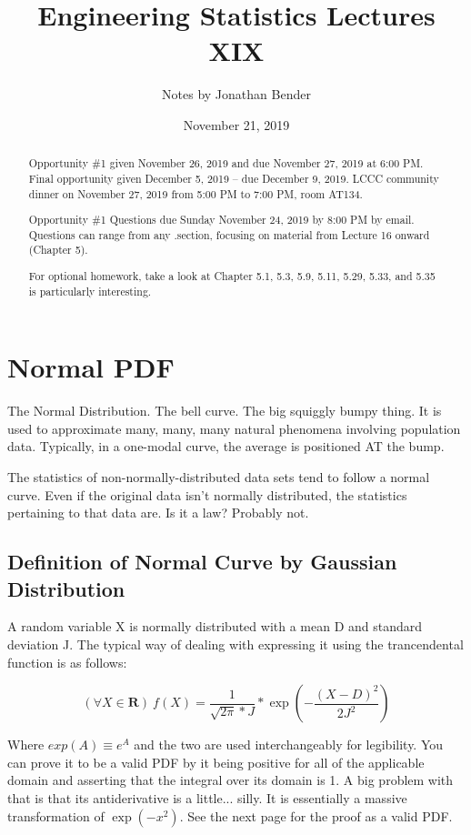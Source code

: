 \documentclass[]{article}
\title{Engineering Statistics Lectures XIX}
\author{Notes by Jonathan Bender}
\date{November 21, 2019}
\begin{document}
	
	\maketitle
	
	\begin{abstract}
		Opportunity \#1 given November 26, 2019 and due November 27, 2019 at 6:00 PM.
		Final opportunity given December 5, 2019 -- due December 9, 2019.
		LCCC community dinner on November 27, 2019 from 5:00 PM to 7:00 PM, room AT134.
		
		Opportunity \#1 Questions due Sunday November 24, 2019 by 8:00 PM by email. Questions can range from any .section, focusing on material from Lecture 16 onward (Chapter 5).
		
		For optional homework, take a look at Chapter 5.1, 5.3, 5.9, 5.11, 5.29, 5.33, and 5.35 is particularly interesting.
	\end{abstract}

	\section{Normal PDF}
		The Normal Distribution. The bell curve. The big squiggly bumpy thing. It is used to approximate many, many, many natural phenomena involving population data. Typically, in a one-modal curve, the average is positioned AT the bump.
		
		The statistics of non-normally-distributed data sets tend to follow a normal curve. Even if the original data isn't normally distributed, the statistics pertaining to that data are. Is it a law? Probably not. 
		
		\subsection{Definition of Normal Curve by Gaussian Distribution}
			A random variable X is normally distributed with a mean D and standard deviation J.
			The typical way of dealing with expressing it using the trancendental function is as follows:
			
			$$(\forall X\in \mathbf{R})\ f(X) = \dfrac{1}{\sqrt{2\pi}*J} * \exp{(-\dfrac{(X-D)^2}{2J^2})}$$
			
			Where $exp(A) \equiv e^A$ and the two are used interchangeably for legibility. You can prove it to be a valid PDF by it being positive for all of the applicable domain and asserting that the integral over its domain is 1. A big problem with that is that its antiderivative is a little... silly. It is essentially a massive transformation of $\exp{(-x^2)}$. See the next page for the proof as a valid PDF.
			
\end{document}
